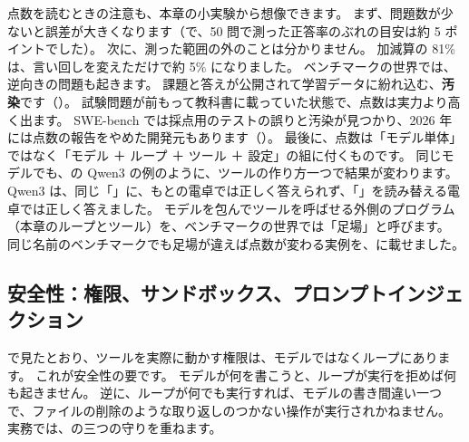 点数を読むときの注意も、本章の小実験から想像できます。
まず、問題数が少ないと誤差が大きくなります（で、50 問で測った正答率のぶれの目安は約 5 ポイントでした）。
次に、測った範囲の外のことは分かりません。
加減算の 81\% は、言い回しを変えただけで約 5\% になりました。
ベンチマークの世界では、逆向きの問題も起きます。
課題と答えが公開されて学習データに紛れ込む、\textbf{汚染}です（）。
試験問題が前もって教科書に載っていた状態で、点数は実力より高く出ます。
SWE-bench では採点用のテストの誤りと汚染が見つかり、2026 年には点数の報告をやめた開発元もあります（）。
最後に、点数は「モデル単体」ではなく「モデル ＋ ループ ＋ ツール ＋ 設定」の組に付くものです。
同じモデルでも、の Qwen3 の例のように、ツールの作り方一つで結果が変わります。
Qwen3 は、同じ「」に、もとの電卓では正しく答えられず、「」を読み替える電卓では正しく答えました。
モデルを包んでツールを呼ばせる外側のプログラム（本章のループとツール）を、ベンチマークの世界では「足場」と呼びます。
同じ名前のベンチマークでも足場が違えば点数が変わる実例を、に載せました。

\subsection{安全性：権限、サンドボックス、プロンプトインジェクション}

で見たとおり、ツールを実際に動かす権限は、モデルではなくループにあります。
これが安全性の要です。
モデルが何を書こうと、ループが実行を拒めば何も起きません。
逆に、ループが何でも実行すれば、モデルの書き間違い一つで、ファイルの削除のような取り返しのつかない操作が実行されかねません。
実務では、の三つの守りを重ねます。

